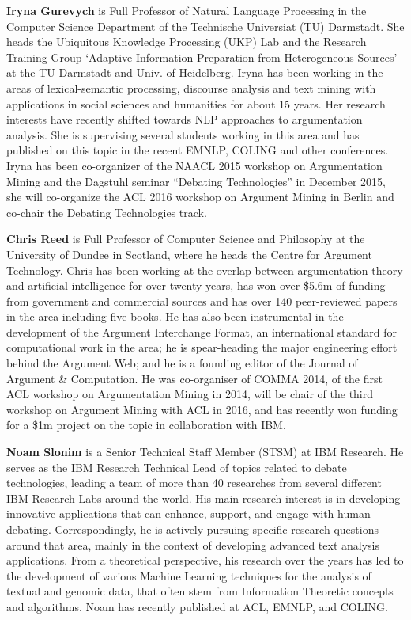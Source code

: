 \begin{bio}
{\bfseries Iryna Gurevych} is Full Professor of Natural Language Processing in the Computer Science Department of the Technische Universiat (TU) Darmstadt. She heads the Ubiquitous Knowledge Processing (UKP) Lab and the Research Training Group `Adaptive Information Preparation from Heterogeneous Sources' at the TU Darmstadt and Univ. of Heidelberg. Iryna has been working in the areas of lexical-semantic processing, discourse analysis and text mining with applications in social sciences and humanities for about 15 years. Her research interests have recently shifted towards NLP approaches to argumentation analysis. She is supervising several students working in this area and has published on this topic in the recent EMNLP, COLING and other conferences. Iryna has been co-organizer of the NAACL 2015 workshop on Argumentation Mining and the Dagstuhl seminar ``Debating Technologies'' in December 2015, she will co-organize the ACL 2016 workshop on Argument Mining in Berlin and co-chair the Debating Technologies track.

{\bfseries Chris Reed} is Full Professor of Computer Science and Philosophy at the University of Dundee in Scotland, where he heads the Centre for Argument Technology. Chris has been working at the overlap between argumentation theory and artificial intelligence for over twenty years, has won over \$5.6m of funding from government and commercial sources and has over 140 peer-reviewed papers in the area including five books. He has also been instrumental in the development of the Argument Interchange Format, an international standard for computational work in the area; he is spear-heading the major engineering effort behind the Argument Web; and he is a founding editor of the Journal of Argument \& Computation. He was co-organiser of COMMA 2014, of the first ACL workshop on Argumentation Mining in 2014, will be chair of the third workshop on Argument Mining with ACL in 2016, and has recently won funding for a \$1m project on the topic in collaboration with IBM.

{\bfseries Noam Slonim} is a Senior Technical Staff Member (STSM) at IBM Research. He serves as the IBM Research Technical Lead of topics related to debate technologies, leading a team of more than 40 researches from several different IBM Research Labs around the world. His main research interest is in developing innovative applications that can enhance, support, and engage with human debating. Correspondingly, he is actively pursuing specific research questions around that area, mainly in the context of developing advanced text analysis applications. From a theoretical perspective, his research over the years has led to the development of various Machine Learning techniques for the analysis of textual and genomic data, that often stem from Information Theoretic concepts and algorithms. Noam has recently published at ACL, EMNLP, and COLING.


\end{bio}
